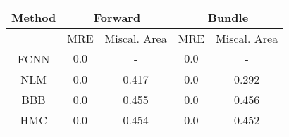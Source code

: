 \documentclass[convert={outext=.png}]{standalone}
\begin{document}
\centering
\label{tab:experimental_results}



\begin{tabular}{c c c c c}
\hline
\hline
Method &  \multicolumn{2}{c}{Forward} & \multicolumn{2}{c}{Bundle} \\ \hline
 & MRE & Miscal. Area & MRE & Miscal. Area\\
 FCNN & $\mathbf{0.0}$ & - & $\mathbf{0.0}$ & - \\
 \hline
 NLM & 0.0 & 0.417 & 0.0 & 0.292 \\
 BBB & 0.0 & 0.455 & 0.0 & 0.456 \\
 HMC & 0.0 & 0.454 & 0.0 & 0.452 \\
\hline
\hline
\end{tabular}
\end{document}
